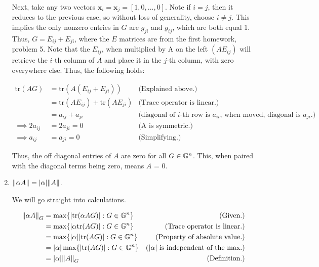 \begin{solution}
\begin{enumerate}[(1)]
        \jump
        Next, take any two vectors $\textbf{x}_i = \textbf{x}_j = [1, 0, ..., 0]$. Note if $i = j$, then it reduces to the previous case, so without loss of generality, choose $i \neq j$. This implies the only nonzero entries in $G$ are $g_{ji}$ and $g_{ij}$, which are both equal 1. Thus, $G = E_{ij} + E_{ji}$, where the $E$ matrices are from the first homework, problem 5. Note that the $E_{ij}$, when multiplied by A on the left $(AE_{ij})$ will retrieve the $i$-th column of $A$ and place it in the $j$-th column, with zero everywhere else. Thus, the following holds:

        \alignbreak
        \begin{align}
            \text{tr}(AG) &= \text{tr}(A(E_{ij} + E_{ji})) &\text{(Explained above.)}\nonumber\\
            &= \text{tr}(AE_{ij}) + \text{tr}(AE_{ji}) &\text{(Trace operator is linear.)}\nonumber\\
            &= a_{ij} + a_{ji} &\text{(diagonal of $i$-th row is $a_{ii}$, when moved, diagonal is $a_{ji}$.)}\nonumber\\
            \implies 2a_{ij} &= 2a_{ji} = 0 &\text{(A is symmetric.)}\nonumber\\
            \implies a_{ij} &= a_{ji} = 0 &\text{(Simplifying.)}\nonumber
        \end{align}
        \alignbreak

           Thus, the off diagonal entries of $A$ are zero for all $G \in \mathbb{G}^n$. This, when paired with the diagonal terms being zero, means $A$ = 0.

           \item $\norm{\alpha A} = |\alpha| \norm{A}$.
            
            \jump
            We will go straight into calculations. 
            
            \alignbreak
            \begin{align}
                \norm{\alpha A}_G &= \max \{ |\text{tr}(\alpha AG)| : G \in \mathbb{G}^n \} &\text{(Given.)}\nonumber\\
                &= \max \{ |\alpha\text{tr}(AG)| : G \in \mathbb{G}^n \} &\text{(Trace operator is linear.)}\nonumber\\
                &= \max \{ |\alpha| |\text{tr}(AG)| : G \in \mathbb{G}^n \} &\text{(Property of absolute value.)}\nonumber\\
                &= |\alpha|\max \{ |\text{tr}(AG)| : G \in \mathbb{G}^n \} &\text{($|\alpha|$ is independent of the max.)}\nonumber\\
                &= |\alpha| \norm{A}_G &\text{(Definition.)}\nonumber
            \end{align}
            \alignbreak


\end{enumerate}
\end{solution}
